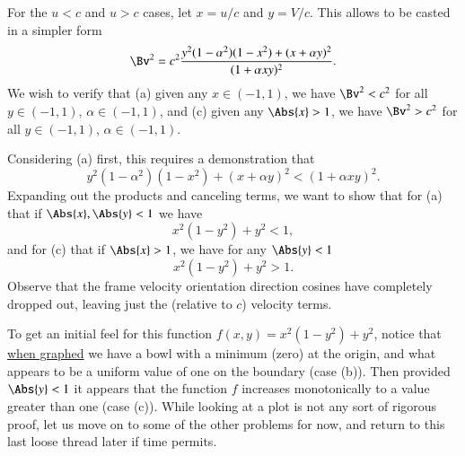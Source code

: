 {For the \(u < c\) and \(u > c\) cases, let \(x = u/c\) and \(y = V/c\).  This allows  to be casted in a simpler form
%
\begin{equation}\label{eqn:relativisticElectrodynamicsA1:270e}
\Bv^2 = c^2 \frac{y^2 (1 - \alpha^2)(1 - x^2) + (x + \alpha y)^2}{ (1 + \alpha x y)^2 }.
\end{equation}
%
We wish to verify that (a) given any \(x \in (-1,1)\), we have \(\Bv^2 < c^2\) for all \(y \in (-1,1)\), \(\alpha \in (-1,1)\), and (c) given any \(\Abs{x} > 1\), we have \(\Bv^2 > c^2\) for all \(y \in (-1,1)\), \(\alpha \in (-1,1)\).

Considering (a) first, this requires a demonstration that
%
\begin{equation}\label{eqn:relativisticElectrodynamicsA1:280}
y^2 (1 - \alpha^2)(1 - x^2) + (x + \alpha y)^2 < (1 + \alpha x y)^2 .
\end{equation}
%
Expanding out the products and canceling terms, we want to show that for (a) that if \(\Abs{x},\Abs{y} < 1\) we have
%
\begin{equation}\label{eqn:relativisticElectrodynamicsA1:290a}
x^2 (1 - y^2) + y^2 < 1,
\end{equation}
%
and for (c) that if \(\Abs{x} > 1\), we have for any \(\Abs{y} < 1\)
%
\begin{equation}\label{eqn:relativisticElectrodynamicsA1:290c}
x^2 (1 - y^2) + y^2 > 1.
\end{equation}
%
Observe that the frame velocity orientation direction cosines have completely dropped out, leaving just the (relative to \(c\)) velocity terms.

To get an initial feel for this function \(f(x,y) = x^2 (1 - y^2) + y^2\), notice that \href{http://goo.gl/5AnNF}{when graphed} we have a bowl with a minimum (zero) at the origin, and what appears to be a uniform value of one on the boundary (case (b)).  Then provided \(\Abs{y} < 1\) it appears that the function \(f\) increases monotonically to a value greater than one (case (c)).  While looking at a plot is not any sort of rigorous proof, let us move on to some of the other problems for now, and return to this last loose thread later if time permits.


} %


